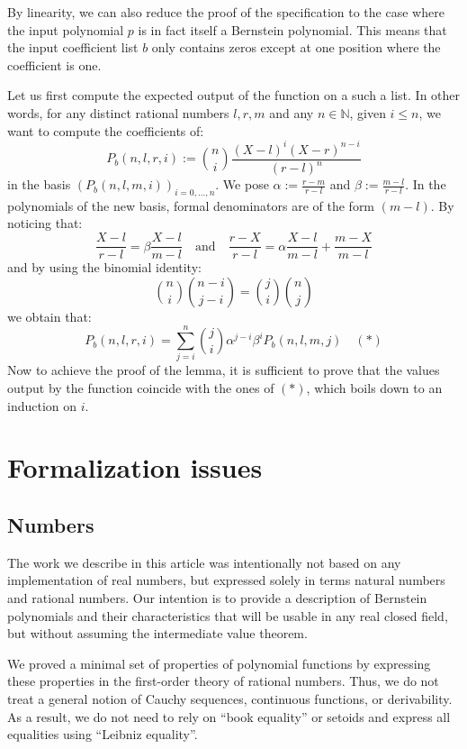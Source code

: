 \documentclass{mscs}
\begin{document}
By linearity, we can also reduce the proof of the 
specification to the case where the input polynomial $p$ is in fact
itself a Bernstein polynomial. This means that the input coefficient
list $b$ only contains zeros except at one position where the
coefficient is one.

Let us first compute the expected output of the  function on
a such a list. In other words, for any distinct rational numbers $l,
r, m$ and any $n\in \mathbb{N}$, given $i \leq n$, we want to compute
the coefficients of:
$$P_b(n, l, r, i) := \binom{n}{i} \frac{(X - l)^i(X - r)^{n -i}}
{(r - l)^n}$$ in the basis $(P_b(n, l, m, i))_{i = 0, \dots, n}$.
We pose
$\alpha := \frac{r -  m}{r - l}$ and $\beta := \frac{m - l}{r - l}$.
In the polynomials of the new basis, formal denominators are of the
form $(m - l)$. By noticing that:
$$\frac{X - l}{r-l} = \beta \frac{X - l}{m - l} \quad \textrm{and} \quad
\frac{r - X}{r - l} = \alpha\frac{X - l}{m - l} +\frac{m - X}{m - l}$$
and by using the binomial identity:
$$\binom{n}{i}\binom{n - i}{j - i}  = \binom{j}{i}\binom{n}{j}$$
we obtain that:
$$P_b(n, l, r, i) =
\sum_{j = i}^n\binom{j}{i}\alpha^{j-i}\beta^i P_b(n, l, m, j)  \quad (*)$$
Now to achieve the proof of the  lemma, it is
sufficient to prove that the values output by the  function
coincide with the ones of $(*)$, which boils down to an induction on $i$.

\section{Formalization issues}
\label{sec:formal}
\subsection{Numbers}
The work we describe in this article was intentionally not based on any
implementation of real numbers, but expressed solely in terms natural
numbers and rational numbers.  Our intention is to provide a description
of Bernstein polynomials and their characteristics that will be usable in any
real closed field, but without assuming the intermediate value theorem.

We proved a minimal set of properties of polynomial functions by expressing
these properties in the first-order theory of rational numbers.  Thus, we
do not treat a general notion of Cauchy sequences, continuous functions, or
derivability.  As a result, we do not need to rely on ``book equality'' or
setoids and express all equalities using ``Leibniz equality''.
\end{document}
